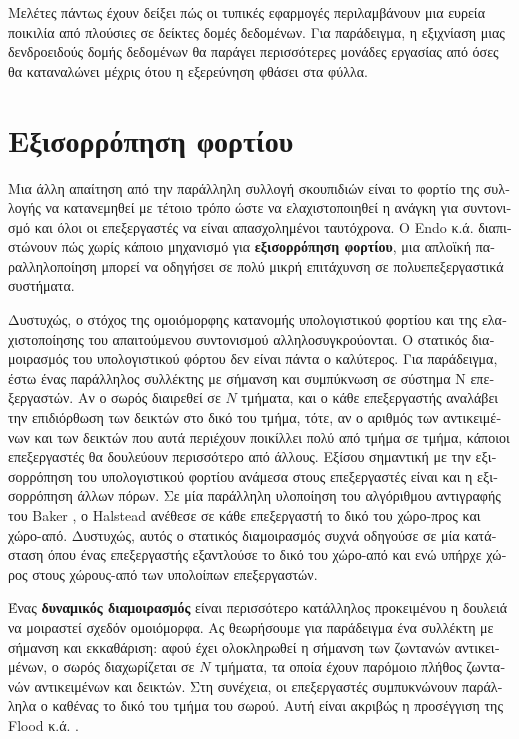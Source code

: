 \begin{greek}
Μελέτες πάντως έχουν δείξει πώς οι τυπικές εφαρμογές περιλαμβάνουν
μια ευρεία ποικιλία από πλούσιες σε δείκτες δομές δεδομένων.
Για παράδειγμα, η εξιχνίαση μιας δενδροειδούς δομής δεδομένων
θα παράγει περισσότερες μονάδες εργασίας από όσες θα καταναλώνει
μέχρις ότου η εξερεύνηση φθάσει στα φύλλα.

\section{Εξισορρόπηση φορτίου}
Μια άλλη απαίτηση από την παράλληλη συλλογή σκουπιδιών είναι
το φορτίο της συλλογής να κατανεμηθεί με τέτοιο τρόπο ώστε να
ελαχιστοποιηθεί η ανάγκη για συντονισμό και όλοι οι επεξεργαστές
να είναι απασχολημένοι ταυτόχρονα. Ο Endo κ.ά. \cite{DBLP:conf/sc/EndoTY97}
διαπιστώνουν πώς χωρίς κάποιο μηχανισμό για \textbf{εξισορρόπηση
φορτίου}, μια απλοϊκή παραλληλοποίηση μπορεί να οδηγήσει σε
πολύ μικρή επιτάχυνση σε πολυεπεξεργαστικά συστήματα.

Δυστυχώς, ο στόχος της ομοιόμορφης κατανομής υπολογιστικού φορτίου
και της ελαχιστοποίησης του απαιτούμενου συντονισμού αλληλοσυγκρούονται.
Ο στατικός διαμοιρασμός του υπολογιστικού φόρτου δεν είναι
πάντα ο καλύτερος. Για παράδειγμα, έστω ένας παράλληλος συλλέκτης
με σήμανση και συμπύκνωση σε σύστημα N επεξεργαστών. Αν ο σωρός
διαιρεθεί σε $N$ τμήματα, και ο κάθε επεξεργαστής αναλάβει την
επιδιόρθωση των δεικτών στο δικό του τμήμα, τότε, αν ο αριθμός
των αντικειμένων και των δεικτών που αυτά περιέχουν ποικίλλει
πολύ από τμήμα σε τμήμα, κάποιοι επεξεργαστές θα δουλεύουν
περισσότερο από άλλους. Εξίσου σημαντική με την εξισορρόπηση
του υπολογιστικού φορτίου ανάμεσα στους επεξεργαστές είναι
και η εξισορρόπηση άλλων πόρων. Σε μία παράλληλη υλοποίηση
του αλγόριθμου αντιγραφής του Baker \cite{DBLP:journals/cacm/Baker78},
ο Halstead \cite{DBLP:conf/lfp/Halstead84, DBLP:journals/toplas/Halstead85}
ανέθεσε σε κάθε επεξεργαστή το δικό του χώρο-προς και χώρο-από.
Δυστυχώς, αυτός ο στατικός διαμοιρασμός συχνά οδηγούσε σε μία
κατάσταση όπου ένας επεξεργαστής εξαντλούσε το δικό του χώρο-από
και ενώ υπήρχε χώρος στους χώρους-από των υπολοίπων επεξεργαστών.

Ένας \textbf{δυναμικός διαμοιρασμός} είναι περισσότερο κατάλληλος
προκειμένου η δουλειά να μοιραστεί σχεδόν ομοιόμορφα. Ας θεωρήσουμε
για παράδειγμα ένα συλλέκτη με σήμανση και εκκαθάριση: αφού έχει
ολοκληρωθεί η σήμανση των ζωντανών αντικειμένων, ο σωρός διαχωρίζεται
σε $Ν$ τμήματα, τα οποία έχουν παρόμοιο πλήθος ζωντανών αντικειμένων
και δεικτών. Στη συνέχεια, οι επεξεργαστές συμπυκνώνουν παράλληλα
ο καθένας το δικό του τμήμα του σωρού. Αυτή είναι ακριβώς η
προσέγγιση της Flood κ.ά. \cite{DBLP:conf/jvm/FloodDSZ01}.


\end{greek}
